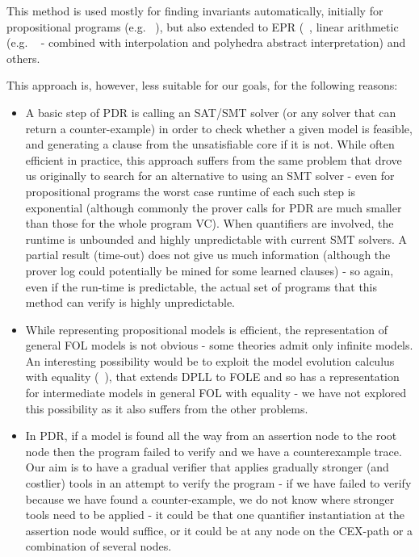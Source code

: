This method is used mostly for finding invariants automatically, initially for propositional programs (e.g. ~\cite{Bradley12}), but also extended to EPR (~\cite{BjornerGurfinkelKorovinLahav2013}, linear arithmetic (e.g. ~\cite{BjornerGurfinkel2015} - combined with interpolation and polyhedra abstract interpretation) and others.

This approach is, however, less suitable for our goals, for the following reasons:
\begin{itemize}
	\item A basic step of PDR is calling an SAT/SMT solver (or any solver that can return a counter-example) in order to check whether a given model is feasible, and generating a clause from the unsatisfiable core if it is not. 
	While often efficient in practice, this approach suffers from the same problem that drove us originally to search for an alternative to using an SMT solver - even for propositional programs the worst case runtime of each such step is exponential (although commonly the prover calls for PDR are much smaller than those for the whole program VC). When quantifiers are involved, the runtime is unbounded and highly unpredictable with current SMT solvers. 
	A partial result (time-out) does not give us much information (although the prover log could potentially be mined for some learned clauses) - so again, even if the run-time is predictable, the actual set of programs that this method can verify is highly unpredictable.
	\item While representing propositional models is efficient, the representation of general FOL models is not obvious - some theories admit only infinite models. 
	An interesting possibility would be to exploit the  model evolution calculus with equality (~\cite{BaumgartnerPelzerTinelli12}), that extends DPLL to FOLE and so has a representation for intermediate models in general FOL with equality - we have not explored this possibility as it also suffers from the other problems.
	\item In PDR, if a model is found all the way from an assertion node to the root node then the program failed to verify and we have a counterexample trace. Our aim is to have a gradual verifier that applies gradually stronger (and costlier) tools in an attempt to verify the program - if we have failed to verify because we have found a counter-example, we do not know where stronger tools need to be applied - it could be that one quantifier instantiation at the assertion node would suffice, or it could be at any node on the CEX-path or a combination of several nodes. 

\end{itemize}
